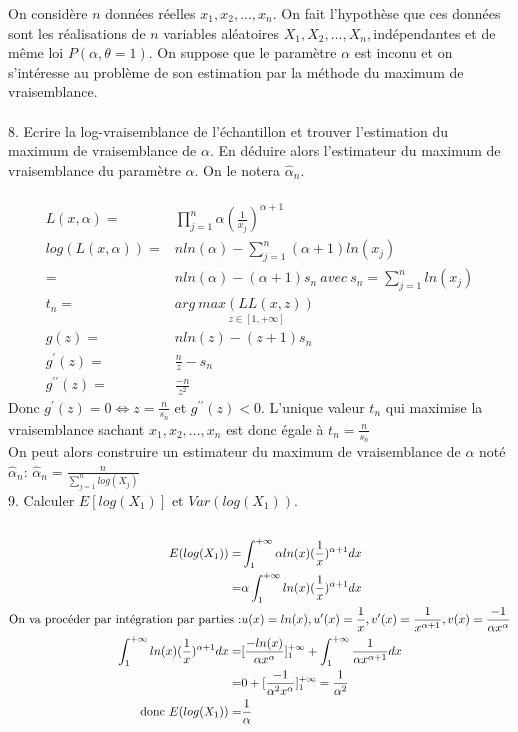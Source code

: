 \documentclass{article}
\begin{document}
On considère $n$ données réelles $x_{1},x_{2},...,x_{n}.$ On fait
l'hypothèse que ces données sont les réalisations de $n$ variables
aléatoires $X_{1},X_{2},...,X_{n},$indépendantes et de même loi $P(\alpha,\theta=1).$
On suppose que le paramètre $\alpha$ est inconu et on s'intéresse
au problème de son estimation par la méthode du maximum de vraisemblance.\\
\\
8. Ecrire la log-vraisemblance de l\textquoteright échantillon et
trouver l\textquoteright estimation du maximum de vraisemblance de
$\alpha$. En déduire alors l\textquoteright estimateur du maximum
de vraisemblance du paramètre $\alpha$. On le notera $\widehat{\alpha}_{n}$.\\
\\
\begin{align*}
L(x,\alpha)= & \prod_{j=1}^{n}\alpha(\frac{1}{x_{j}})^{\alpha+1}\\
log(L(x,\alpha))= & nln(\alpha)-\sum_{j=1}^{n}(\alpha+1)ln(x_{j})\\
= & nln(\alpha)-(\alpha+1)s_{n}\ avec\ s_{n}=\sum_{j=1}^{n}ln(x_{j})\\
t_{n}= & arg\ \underset{z\in[1,+\infty]}{max(LL(x,z))}\\
g(z)= & nln(z)-(z+1)s_{n}\\
g^{\prime}(z)= & \frac{n}{z}-s_{n}\\
g^{\prime\prime}(z)= & \frac{-n}{z^{2}}
\end{align*}
Donc $g^{\prime}(z)=0\Leftrightarrow z=\frac{n}{s_{n}}$ et $g^{\prime\prime}(z)<0.$
L'unique valeur $t_{n}$ qui maximise la vraisemblance sachant $x_{1},x_{2},...,x_{n}$
est donc égale à $t_{n}=\frac{n}{s_{n}}$\\
On peut alors construire un estimateur du maximum de vraisemblance
de $\alpha$ noté $\widehat{\alpha}_{n}$: $\widehat{\alpha}_{n}=\frac{n}{\sum_{j=1}^{n}log(X_{j})}$\\
9. Calculer $E[log(X_{1})]$ et $Var(log(X_{1})).$\\
\\
\begin{align*}
E(log(X_{1}))= & \int_{1}^{+\infty}\alpha ln(x)(\frac{1}{x}){}^{\alpha+1}dx\\
= & \alpha\int_{1}^{+\infty}ln(x)(\frac{1}{x})^{\alpha+1}dx\\
\text{On va procéder par intégration par parties :} & u(x)=ln(x),u^{\prime}(x)=\frac{1}{x},v^{\prime}(x)=\frac{1}{x^{\alpha+1}},v(x)=\frac{-1}{\alpha x^{\alpha}}\\
\int_{1}^{+\infty}ln(x)(\frac{1}{x})^{\alpha+1}dx= & [\frac{-ln(x)}{\alpha x^{\alpha}}]_{1}^{+\infty}+\int_{1}^{+\infty}\frac{1}{\alpha x^{\alpha+1}}dx\\
= & 0+[\frac{-1}{\alpha^{2}x^{\alpha}}]_{1}^{+\infty}=\frac{1}{\alpha^{2}}\\
\text{donc \ensuremath{E(log(X_{1}))=}} & \frac{1}{\alpha}
\end{align*}
\end{document}
